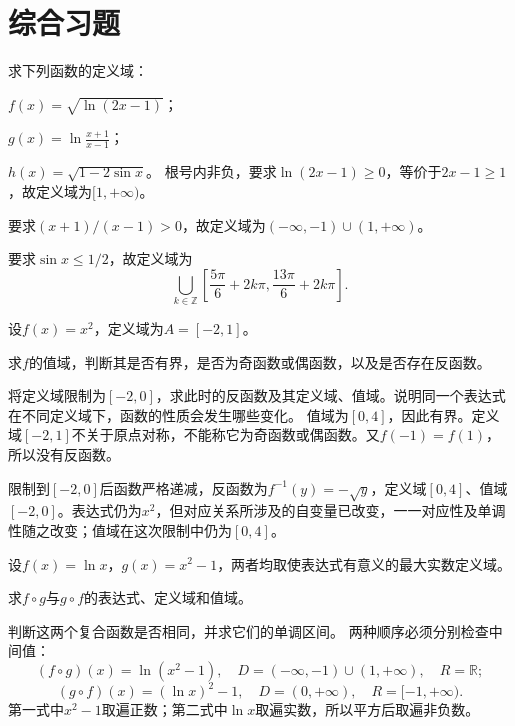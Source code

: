 \par\addvspace{12pt}

\section{综合习题}

\label{sol:sec:functions:6}

求下列函数的定义域：

\quad {}\(f(x) = \sqrt{\ln \left( 2 x - 1 \right)}\)；

\quad {}\(g(x) = \ln \frac{x + 1}{x - 1}\)；

\quad {}\(h(x) = \sqrt{1 - 2 \sin x}\)。
\solutionanswer
{}根号内非负，要求\(\ln(2x-1)\ge0\)，等价于\(2x-1\ge1\)，故定义域为\([1,+\infty)\)。

要求\((x+1)/(x-1)>0\)，故定义域为\(( -\infty,-1)\cup(1,+\infty)\)。

要求\(\sin x\le1/2\)，故定义域为
\[
\bigcup_{k\in\mathbb Z}\left[\frac{5\pi}6+2k\pi,\frac{13\pi}6+2k\pi\right].
\]


设\(f(x) = x^{2}\)，定义域为\(A = [-2 , 1]\)。

\quad {}求\(f\)的值域，判断其是否有界，是否为奇函数或偶函数，以及是否存在反函数。

\quad {}将定义域限制为\([-2 , 0]\)，求此时的反函数及其定义域、值域。说明同一个表达式在不同定义域下，函数的性质会发生哪些变化。
\solutionanswer
{}值域为\([0,4]\)，因此有界。定义域\([-2,1]\)不关于原点对称，不能称它为奇函数或偶函数。又\(f(-1)=f(1)\)，所以没有反函数。

限制到\([-2,0]\)后函数严格递减，反函数为\(f^{-1}(y)=-\sqrt y\)，定义域\([0,4]\)、值域\([-2,0]\)。表达式仍为\(x^2\)，但对应关系所涉及的自变量已改变，一一对应性及单调性随之改变；值域在这次限制中仍为\([0,4]\)。


设\(f(x) = \ln x\)，\(g(x) = x^{2} - 1\)，两者均取使表达式有意义的最大实数定义域。

\quad {}求\(f \circ g\)与\(g \circ f\)的表达式、定义域和值域。

\quad {}判断这两个复合函数是否相同，并求它们的单调区间。
\solutionanswer
{}两种顺序必须分别检查中间值：
\[
(f\circ g)(x)=\ln(x^2-1),\quad D=(-\infty,-1)\cup(1,+\infty),\quad R=\mathbb R;
\]
\[
(g\circ f)(x)=(\ln x)^2-1,\quad D=(0,+\infty),\quad R=[-1,+\infty).
\]
第一式中\(x^2-1\)取遍正数；第二式中\(\ln x\)取遍实数，所以平方后取遍非负数。

